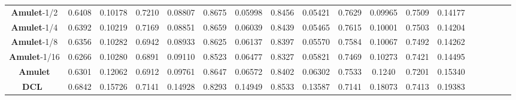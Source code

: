 \documentclass[10pt,twocolumn,letterpaper]{article}
\begin{document}
\begin{table*}
\begin{center}
\begin{tabular}{|c|c|c|c|c|c|c|c|c|c|c|c|c|c|c|c|c|c|c|c|c|c|c|c|c|||c|c|c|c|c|c|c|c|||}
\multicolumn{4}{|c|}{\textbf{Amulet}-1/2}
&\multicolumn{2}{|c|}{0.6408}&\multicolumn{2}{|c|}{0.10178}&\multicolumn{2}{|c|}{0.7210}&\multicolumn{2}{|c|}{0.08807}&\multicolumn{2}{|c|}{\textcolor[rgb]{0,0,1}{0.8675}}&\multicolumn{2}{|c|}{0.05998}&\multicolumn{2}{|c|}{0.8456}&\multicolumn{2}{|c|}{0.05421}&\multicolumn{2}{|c|}{0.7629}&\multicolumn{2}{|c|}{0.09965}&\multicolumn{2}{|c|}{0.7509}&\multicolumn{2}{|c|}{0.14177}\\
\multicolumn{4}{|c|}{\textbf{Amulet}-1/4}
&\multicolumn{2}{|c|}{0.6392}&\multicolumn{2}{|c|}{0.10219}&\multicolumn{2}{|c|}{0.7169}&\multicolumn{2}{|c|}{0.08851}&\multicolumn{2}{|c|}{0.8659}&\multicolumn{2}{|c|}{0.06039}&\multicolumn{2}{|c|}{0.8439}&\multicolumn{2}{|c|}{0.05465}&\multicolumn{2}{|c|}{0.7615}&\multicolumn{2}{|c|}{0.10001}&\multicolumn{2}{|c|}{0.7503}&\multicolumn{2}{|c|}{0.14204}\\
\multicolumn{4}{|c|}{\textbf{Amulet}-1/8}
&\multicolumn{2}{|c|}{0.6356}&\multicolumn{2}{|c|}{0.10282}&\multicolumn{2}{|c|}{0.6942}&\multicolumn{2}{|c|}{0.08933}&\multicolumn{2}{|c|}{0.8625}&\multicolumn{2}{|c|}{0.06137}&\multicolumn{2}{|c|}{0.8397}&\multicolumn{2}{|c|}{0.05570}&\multicolumn{2}{|c|}{0.7584}&\multicolumn{2}{|c|}{0.10067}&\multicolumn{2}{|c|}{0.7492}&\multicolumn{2}{|c|}{0.14262}\\
\multicolumn{4}{|c|}{\textbf{Amulet}-1/16}
&\multicolumn{2}{|c|}{0.6266}&\multicolumn{2}{|c|}{0.10280}&\multicolumn{2}{|c|}{0.6891}&\multicolumn{2}{|c|}{0.09110}&\multicolumn{2}{|c|}{0.8523}&\multicolumn{2}{|c|}{0.06477}&\multicolumn{2}{|c|}{0.8327}&\multicolumn{2}{|c|}{0.05821}&\multicolumn{2}{|c|}{0.7469}&\multicolumn{2}{|c|}{0.10273}&\multicolumn{2}{|c|}{0.7421}&\multicolumn{2}{|c|}{0.14495}\\
\multicolumn{4}{|c|}{\textbf{Amulet}}
&\multicolumn{2}{|c|}{0.6301}&\multicolumn{2}{|c|}{0.12062}&\multicolumn{2}{|c|}{0.6912}&\multicolumn{2}{|c|}{0.09761}&\multicolumn{2}{|c|}{0.8647}&\multicolumn{2}{|c|}{0.06572}&\multicolumn{2}{|c|}{0.8402}&\multicolumn{2}{|c|}{0.06302}&\multicolumn{2}{|c|}{0.7533}&\multicolumn{2}{|c|}{0.1240}&\multicolumn{2}{|c|}{0.7201}&\multicolumn{2}{|c|}{0.15340}\\
\hline
\multicolumn{4}{|c|}{\textbf{DCL}~\cite{LiYu16}}
&\multicolumn{2}{|c|}{\textcolor[rgb]{1,0,0}{0.6842}}&\multicolumn{2}{|c|}{0.15726}&\multicolumn{2}{|c|}{0.7141}&\multicolumn{2}{|c|}{0.14928}&\multicolumn{2}{|c|}{0.8293}&\multicolumn{2}{|c|}{0.14949}&\multicolumn{2}{|c|}{0.8533}&\multicolumn{2}{|c|}{0.13587}&\multicolumn{2}{|c|}{0.7141}&\multicolumn{2}{|c|}{0.18073}&\multicolumn{2}{|c|}{0.7413}&\multicolumn{2}{|c|}{0.19383}\\

\end{tabular}
\end{center}
\end{table*}
\end{document}
